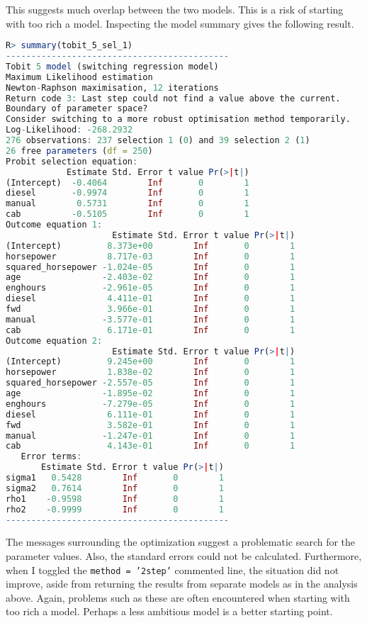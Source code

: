 \documentclass[11pt]{paper}
\begin{document}
This suggests much overlap between the two models.
This is a risk of starting with too rich a model. 
Inspecting the model summary gives the following result.


\begin{lstlisting}[language=R]
R> summary(tobit_5_sel_1)
--------------------------------------------
Tobit 5 model (switching regression model)
Maximum Likelihood estimation
Newton-Raphson maximisation, 12 iterations
Return code 3: Last step could not find a value above the current.
Boundary of parameter space?  
Consider switching to a more robust optimisation method temporarily.
Log-Likelihood: -268.2932 
276 observations: 237 selection 1 (0) and 39 selection 2 (1)
26 free parameters (df = 250)
Probit selection equation:
            Estimate Std. Error t value Pr(>|t|)
(Intercept)  -0.4064        Inf       0        1
diesel       -0.9974        Inf       0        1
manual        0.5731        Inf       0        1
cab          -0.5105        Inf       0        1
Outcome equation 1:
                     Estimate Std. Error t value Pr(>|t|)
(Intercept)         8.373e+00        Inf       0        1
horsepower          8.717e-03        Inf       0        1
squared_horsepower -1.024e-05        Inf       0        1
age                -2.403e-02        Inf       0        1
enghours           -2.961e-05        Inf       0        1
diesel              4.411e-01        Inf       0        1
fwd                 3.966e-01        Inf       0        1
manual             -3.577e-01        Inf       0        1
cab                 6.171e-01        Inf       0        1
Outcome equation 2:
                     Estimate Std. Error t value Pr(>|t|)
(Intercept)         9.245e+00        Inf       0        1
horsepower          1.838e-02        Inf       0        1
squared_horsepower -2.557e-05        Inf       0        1
age                -1.895e-02        Inf       0        1
enghours           -7.279e-05        Inf       0        1
diesel              6.111e-01        Inf       0        1
fwd                 3.582e-01        Inf       0        1
manual             -1.247e-01        Inf       0        1
cab                 4.143e-01        Inf       0        1
   Error terms:
       Estimate Std. Error t value Pr(>|t|)
sigma1   0.5428        Inf       0        1
sigma2   0.7614        Inf       0        1
rho1    -0.9598        Inf       0        1
rho2    -0.9999        Inf       0        1
--------------------------------------------
\end{lstlisting}

The messages surrounding the optimization suggest a problematic
search for the parameter values. 
Also, the standard errors could not be calculated.
Furthermore, when I toggled the \texttt{method = '2step'} commented line, 
the situation did not improve, aside from returning the results from separate models as in the analysis above. 
% 
Again, problems such as these are often encountered when starting with too rich a model. 
Perhaps a less ambitious model is a better starting point. 
\end{document}
